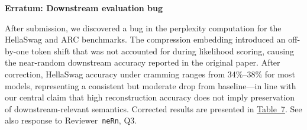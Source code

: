 \textbf{Erratum: Downstream evaluation bug}

After submission, we discovered a bug in the perplexity computation for the HellaSwag and ARC benchmarks. The compression embedding introduced an off-by-one token shift that was not accounted for during likelihood scoring, causing the near-random downstream accuracy reported in the original paper. After correction, HellaSwag accuracy under cramming ranges from 34\%--38\% for most models, representing a consistent but moderate drop from baseline---in line with our central claim that high reconstruction accuracy does not imply preservation of downstream-relevant semantics. Corrected results are presented in \href{https://drive.google.com/file/d/1DIjiTpyIqQ4xuW0k9Q7mjCOFuXUPz2YX/view?usp=sharing}{Table~7}. See also response to Reviewer~\texttt{neRn}, Q3.
